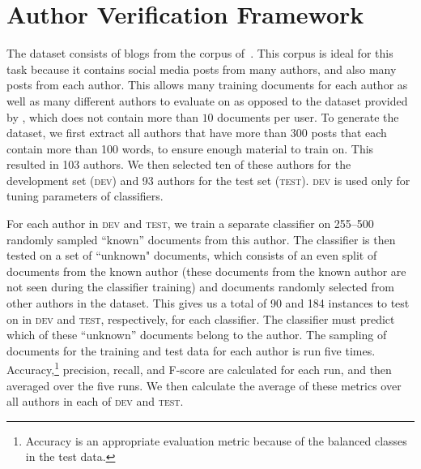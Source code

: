 \documentclass[11pt]{article}
\newcommand\dev{\textsc{dev}\xspace}
\newcommand\test{\textsc{test}\xspace}
\begin{document}
\section{Author Verification Framework}\label{sec:overview}
The dataset consists of blogs from the corpus
of~\cite{schler2006effects}. This corpus is ideal for this task
because it contains social media posts from many authors, and also
many posts from each author. This allows many training documents for
each author as well as many different authors to evaluate on as
opposed to the dataset provided by \cite{stamatatos:2014}, which does
not contain more than $10$ documents per user. To generate the
dataset, we first extract all authors that have more than 300 posts
that each contain more than 100 words, to ensure enough material to
train on. This resulted in 103 authors. We then selected ten of these
authors for the development set (\dev) and 93 authors for the test set
(\test). \dev is used only for tuning parameters of classifiers.

For each author in \dev and \test, we train a separate classifier on
255--500 randomly sampled ``known'' documents from this author. The
classifier is then tested on a set of ``unknown" documents, which
consists of an even split of documents from the known author (these
documents from the known author are not seen during the classifier
training) and documents randomly selected from other authors in the
dataset. This gives us a total of 90 and 184 instances to test on in
\dev and \test, respectively, for each classifier. The classifier must
predict which of these ``unknown'' documents belong to the author. The
sampling of documents for the training and test data for each author
is run five times. Accuracy,\footnote{Accuracy is an appropriate
  evaluation metric because of the balanced classes in the test data.}
precision, recall, and F-score are calculated for each run, and then
averaged over the five runs. We then calculate the average of these
metrics over all authors in each of \dev and \test.

\end{document}
